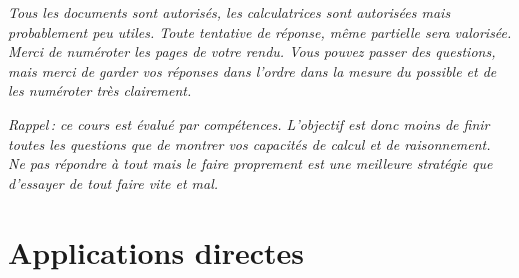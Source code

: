 \documentclass[a4paper, 11pt]{exam}
\title{\titlepagetitle}
\author{\myname}
\date{\docdate}
\begin{document}

\emph{Tous les documents sont autorisés, les calculatrices sont autorisées mais probablement peu utiles. Toute tentative de réponse, même partielle sera valorisée. Merci de numéroter les pages de votre rendu. Vous pouvez passer des questions, mais merci de garder vos réponses dans l'ordre dans la mesure du possible et de les numéroter très clairement.}

\emph{Rappel : ce cours est évalué par compétences. L'objectif est donc moins de finir toutes les questions que de montrer vos capacités de calcul et de raisonnement. Ne pas répondre à tout mais le faire proprement est une meilleure stratégie que d'essayer de tout faire vite et mal.}

\section{Applications directes}
\end{document}
